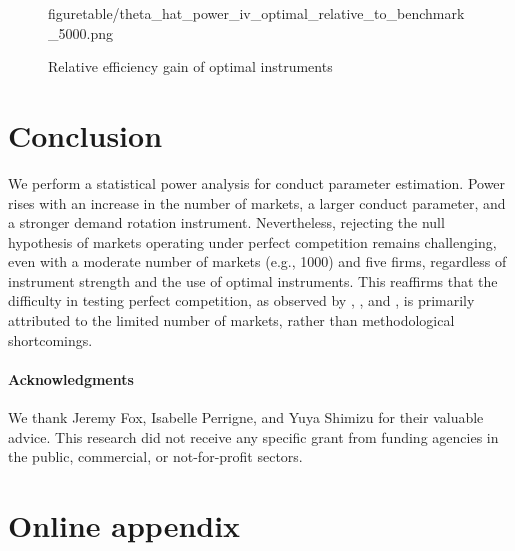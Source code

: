 \documentclass[11pt, a4paper]{article}
\begin{document}
\begin{figure}[!ht]
\begin{center}
{  {figuretable/theta_hat_power_iv_optimal_relative_to_benchmark_5000.png}}
  \caption{Relative efficiency gain of optimal instruments}
  \label{fg:theta_hat_power_iv_optimal_relative_to_benchmark_10000}
  \end{center}
\end{figure} 



\section{Conclusion}

We perform a statistical power analysis for conduct parameter estimation. Power rises with an increase in the number of markets, a larger conduct parameter, and a stronger demand rotation instrument. 
Nevertheless, rejecting the null hypothesis of markets operating under perfect competition remains challenging, even with a moderate number of markets (e.g., 1000) and five firms, regardless of instrument strength and the use of optimal instruments. 
This reaffirms that the difficulty in testing perfect competition, as observed by \cite{genesove1998testing}, \cite{steen1999testing}, and \cite{shaffer1993test}, is primarily attributed to the limited number of markets, rather than methodological shortcomings.

\paragraph{Acknowledgments}
We thank Jeremy Fox, Isabelle Perrigne, and Yuya Shimizu for their valuable advice. This research did not receive any specific grant from funding agencies in the public, commercial, or not-for-profit sectors. 






\newpage

\setcounter{page}{1}
\appendix
\section{Online appendix}\label{sec:appendix}
\end{document}
